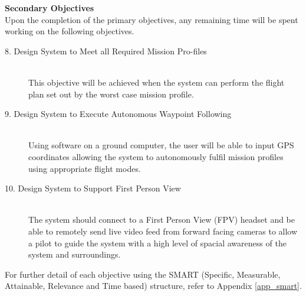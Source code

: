 \textbf{Secondary Objectives}\\
Upon the completion of the primary objectives, any remaining time will be spent working on the following objectives. 
\begin{description}
        \item[8. Design System to Meet all Required Mission Pro-files]\\
        This objective will be achieved when the system can perform the flight plan set out by the worst case mission profile. 
        \item[9. Design System to Execute Autonomous Waypoint Following]\\
        Using software on a ground computer, the user will be able to input GPS coordinates allowing the system to autonomously fulfil mission profiles using appropriate flight modes. 
        \item[10. Design System to Support First Person View]\\
        The system should connect to a First Person View (FPV) headset and be able to remotely send live video feed from forward facing cameras to allow a pilot to guide the system with a high level of spacial awareness of the system and surroundings. 
    \end{description}

For further detail of each objective using the SMART (Specific, Measurable, Attainable, Relevance and Time based) structure, refer to Appendix \ref{app_smart}. 


